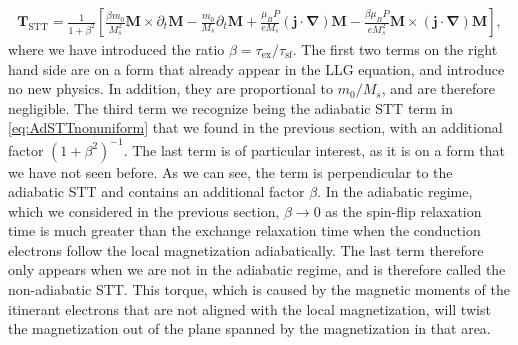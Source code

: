\begin{align}
\mathbold{T}_{\text{STT}} = \frac{1}{1+\beta^2} \left[ \frac{\beta m_0}{M_s^2}\mathbold{M}\times\partial_t\mathbold{M} - \frac{m_0}{M_s} \partial_t\mathbold{M} + \frac{\mu_B P}{e M_s} (\mathbold{j}\cdot\mathbold{\nabla})\mathbold{M} - \frac{\beta \mu_B P}{e M_s^2} \mathbold{M}\times(\mathbold{j}\cdot\mathbold{\nabla})\mathbold{M}\right],
\end{align}
where we have introduced the ratio $\beta = \tau_{\textrm{ex}}/\tau_{\textrm{sf}}$. The first two terms on the right hand side are on a form that already appear in the LLG equation, and introduce no new physics. In addition, they are proportional to $m_0/M_s$, and are therefore negligible. The third term we recognize being the adiabatic STT term in \eqref{eq:AdSTTnonuniform} that we found in the previous section, with an additional factor $(1+\beta^2)^{-1}$. The last term is of particular interest, as it is on a form that we have not seen before. As we can see, the term is perpendicular to the adiabatic STT and contains an additional factor $\beta$. In the adiabatic regime, which we considered in the previous section, $\beta \rightarrow 0$ as the spin-flip relaxation time is much greater than the exchange relaxation time when the conduction electrons follow the local magnetization adiabatically. The last term therefore only appears when we are not in the adiabatic regime, and is therefore called the non-adiabatic STT. This torque, which is caused by the magnetic moments of the itinerant electrons that are not aligned with the local magnetization, will twist the magnetization out of the plane spanned by the magnetization in that area. 